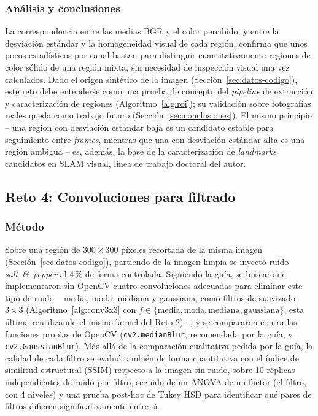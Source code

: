\documentclass[11pt]{article}
\begin{document}
\subsubsection{Análisis y conclusiones}
La correspondencia entre las medias BGR y el color percibido, y entre la
desviación estándar y la homogeneidad visual de cada región, confirma que
unos pocos estadísticos por canal bastan para distinguir cuantitativamente
regiones de color sólido de una región mixta, sin necesidad de inspección
visual una vez calculados. Dado el origen sintético de la imagen
(Sección~\ref{sec:datos-codigo}), este reto debe entenderse como una prueba
de concepto del \emph{pipeline} de extracción y caracterización de
regiones (Algoritmo~\ref{alg:roi}); su validación sobre fotografías reales
queda como trabajo futuro (Sección~\ref{sec:conclusiones}). El mismo
principio -- una región con desviación estándar baja es un candidato
estable para seguimiento entre \emph{frames}, mientras que una con
desviación estándar alta es una región ambigua -- es, además, la base de
la caracterización de \emph{landmarks} candidatos en SLAM visual, línea de
trabajo doctoral del autor.

\subsection{Reto 4: Convoluciones para filtrado}
\label{sec:reto4}

\subsubsection{Método}
Sobre una región de $300\times 300$ píxeles recortada de la misma imagen
(Sección~\ref{sec:datos-codigo}), partiendo de la imagen limpia se inyectó
ruido \emph{salt~\&~pepper} al 4\,\% de forma controlada. Siguiendo la
guía, se buscaron e implementaron sin OpenCV cuatro convoluciones
adecuadas para eliminar este tipo de ruido -- media, moda, mediana y
gaussiana, como filtros de suavizado $3\times 3$ (Algoritmo~\ref{alg:conv3x3}
con $f \in \{\text{media}, \text{moda}, \text{mediana}, \text{gaussiana}\}$,
esta última reutilizando el mismo kernel del Reto 2) --, y se compararon
contra las funciones propias de OpenCV (\texttt{cv2.medianBlur},
recomendada por la guía, y \texttt{cv2.GaussianBlur}). Más allá de la
comparación cualitativa pedida por la guía, la calidad de cada filtro se
evaluó también de forma cuantitativa con el índice de similitud
estructural (SSIM) \citep{wang2004ssim} respecto a la imagen sin ruido,
sobre 10 réplicas independientes de ruido por filtro, seguido de un ANOVA
de un factor (el filtro, con 4 niveles) y una prueba post-hoc de Tukey HSD
para identificar qué pares de filtros difieren significativamente entre
sí.
\end{document}
